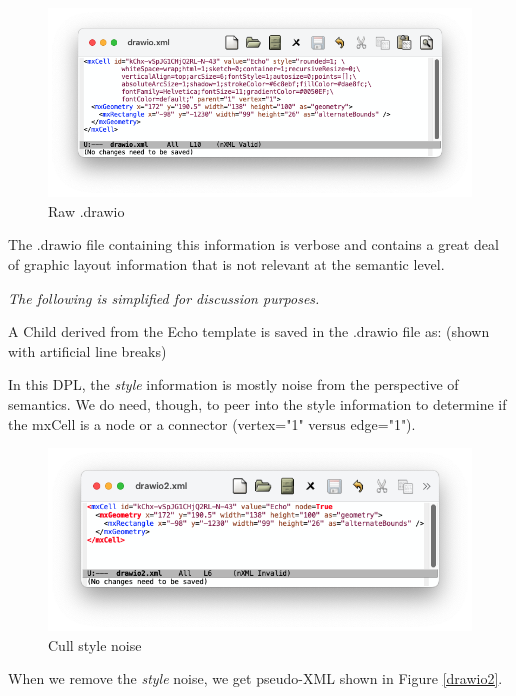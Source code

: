 \documentclass[10pt,anonymous,review]{acmart}
\begin{document}
  \begin{figure}
    \includegraphics[scale=0.4]{./media/drawio1.png}
    \caption{Raw .drawio}
    \label{drawio1}
\end{figure}

The .drawio file containing this information is verbose and contains a great deal of graphic layout information that is not relevant at the semantic level.

\emph{The following is simplified for discussion purposes.}

A Child derived from the Echo template is saved in the .drawio file as: (shown with artificial line breaks)

In this DPL, the \emph{style} information is mostly noise from the perspective of semantics. We do need, though, to peer into the style information to determine if the mxCell is a node or a connector (vertex="1" versus edge="1").

\begin{figure}
    \includegraphics[scale=0.4]{./media/drawio2.png}
    \caption{Cull style noise}
    \label{Darwin}
\end{figure}
When we remove the \emph{style} noise, we get pseudo-XML shown in Figure \ref{drawio2}.
\end{document}
